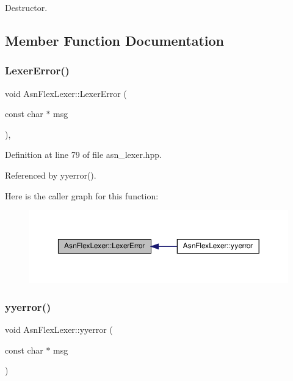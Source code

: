 Destructor. 



\subsection{Member Function Documentation}
\mbox{\label{classAsnFlexLexer_a1cc5845c6f3bd14294270362e4d21e56}} 
\subsubsection{\texorpdfstring{Lexer\+Error()}{LexerError()}}
{\footnotesize\ttfamily void Asn\+Flex\+Lexer\+::\+Lexer\+Error (\begin{DoxyParamCaption}\item[{const char $\ast$}]{msg }\end{DoxyParamCaption})\hspace{0.3cm}{\ttfamily [inline]}, {\ttfamily [override]}}



Definition at line 79 of file asn\+\_\+lexer.\+hpp.



Referenced by yyerror().

Here is the caller graph for this function\+:
\nopagebreak
\begin{figure}[H]
\begin{center}
\leavevmode
\includegraphics[width=350pt]{d9/d6b/classAsnFlexLexer_a1cc5845c6f3bd14294270362e4d21e56_icgraph}
\end{center}
\end{figure}
\mbox{\label{classAsnFlexLexer_a0aedafd7d67e36bee5e6867f3950d8f6}} 
\subsubsection{\texorpdfstring{yyerror()}{yyerror()}}
{\footnotesize\ttfamily void Asn\+Flex\+Lexer\+::yyerror (\begin{DoxyParamCaption}\item[{const char $\ast$}]{msg }\end{DoxyParamCaption})\hspace{0.3cm}{\ttfamily [inline]}}



